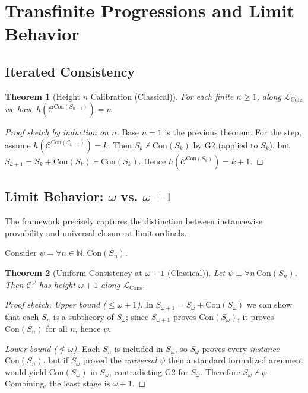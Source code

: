 \documentclass[11pt]{article}
\newtheorem{theorem}{Theorem}[section]
\newcommand{\Con}{\mathrm{Con}}
\newcommand{\LCons}{\mathcal{L}_{\mathrm{Cons}}}
\begin{document}
\section{Transfinite Progressions and Limit Behavior}

\subsection{Iterated Consistency}
\begin{theorem}[Height $n$ Calibration (Classical)]
For each finite $n\ge 1$, along $\LCons$ we have $h\!\left(\mathcal C^{\Con(S_{n-1})}\right)=n$.
\end{theorem}

\begin{proof}[Proof sketch by induction on $n$]
Base $n=1$ is the previous theorem. For the step, assume
$h(\mathcal C^{\Con(S_{k-1})})=k$. Then $S_k\nvdash \Con(S_k)$ by G2 (applied to $S_k$),
but $S_{k+1}=S_k+\Con(S_k)\vdash\Con(S_k)$. Hence $h(\mathcal C^{\Con(S_k)})=k+1$.
\end{proof}

\subsection{Limit Behavior: $\omega$ vs. $\omega+1$}
The framework precisely captures the distinction between instancewise provability and universal closure at limit ordinals.

Consider $\psi = \forall n \in \mathbb{N}.\ \Con(S_n)$.

\begin{theorem}[Uniform Consistency at $\omega+1$ (Classical)]
Let $\psi \equiv \forall n\,\Con(S_n)$. Then $\mathcal C^\psi$ has height $\omega+1$ along $\LCons$.
\end{theorem}

\begin{proof}[Proof sketch]
\emph{Upper bound ($\le \omega{+}1$).} In $S_{\omega+1}=S_\omega+\Con(S_\omega)$ we can show that
each $S_n$ is a subtheory of $S_\omega$; since $S_{\omega+1}$ proves $\Con(S_\omega)$, it proves
$\Con(S_n)$ for all $n$, hence $\psi$.

\emph{Lower bound ($\not\le \omega$).} Each $S_n$ is included in $S_\omega$, so $S_\omega$ proves
every \emph{instance} $\Con(S_n)$, but if $S_\omega$ proved the \emph{universal} $\psi$ then a standard
formalized argument would yield $\Con(S_\omega)$ in $S_\omega$, contradicting G2 for $S_\omega$.
Therefore $S_\omega\nvdash\psi$. Combining, the least stage is $\omega+1$.
\end{proof}
\end{document}
